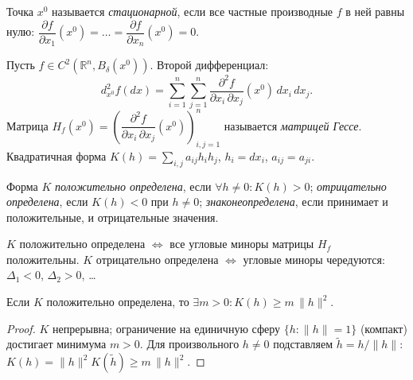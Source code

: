 


\begin{defn}
  Точка $x^0$ называется \emph{стационарной}, если все частные производные $f$ в ней равны нулю:
  $\dfrac{\partial f}{\partial x_1}(x^0) = \ldots = \dfrac{\partial f}{\partial x_n}(x^0) = 0$.
\end{defn}

\begin{defn}
  Пусть $f \in C^2(\mathbb{R}^n, B_\delta(x^0))$. Второй дифференциал:
  \[
    d^2_{x^0} f(dx) = \sum_{i=1}^n\sum_{j=1}^n \frac{\partial^2 f}{\partial x_i\,\partial x_j}(x^0)\,dx_i\,dx_j.
  \]
  Матрица $H_f(x^0) = \left(\dfrac{\partial^2 f}{\partial x_i\,\partial x_j}(x^0)\right)_{i,j=1}^n$
  называется \emph{матрицей Гессе}. Квадратичная форма
  $K(h) = \sum_{i,j} a_{ij} h_i h_j$, $h_i = dx_i$, $a_{ij} = a_{ji}$.
\end{defn}

\begin{defn}
  Форма $K$ \emph{положительно определена}, если $\forall h \neq 0: K(h) > 0$;
  \emph{отрицательно определена}, если $K(h) < 0$ при $h \neq 0$;
  \emph{знаконеопределена}, если принимает и положительные, и отрицательные значения.
\end{defn}

\begin{theorem}
  $K$ положительно определена $\Leftrightarrow$ все угловые миноры матрицы $H_f$ положительны.
  $K$ отрицательно определена $\Leftrightarrow$ угловые миноры чередуются: $\Delta_1 < 0$, $\Delta_2 > 0$, \ldots
\end{theorem}

\begin{lemma}
  Если $K$ положительно определена, то $\exists m > 0: K(h) \geq m\,\|h\|^2$.
  \begin{proof}
    $K$ непрерывна; ограничение на единичную сферу $\{h: \|h\|=1\}$ (компакт) достигает минимума $m > 0$.
    Для произвольного $h \neq 0$ подставляем $\tilde{h} = h/\|h\|$:
    $K(h) = \|h\|^2 K(\tilde{h}) \geq m\,\|h\|^2$. \qedhere
  \end{proof}
\end{lemma}

